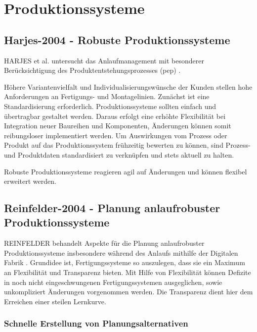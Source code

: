 \section{Produktionssysteme}

\subsection*{Harjes-2004 - Robuste Produktionssysteme}
HARJES et al. untersucht das Anlaufmanagement mit besonderer Berücksichtigung des Produktentstehungsprozesses (\gls{pep}) \autocite{Harjes2004}. 

Höhere Variantenvielfalt und Individualisierungswünsche der Kunden stellen hohe Anforderungen an Fertigungs- und Montagelinien. Zunächst ist eine Standardisierung erforderlich. Produktionssysteme sollten einfach und übertragbar gestaltet werden. Daraus erfolgt eine erhöhte Flexibilität bei Integration neuer Baureihen und Komponenten, Änderungen können somit reibungsloser implementiert werden. Um Auswirkungen vom Prozess oder Produkt auf das Produktionssystem frühzeitig bewerten zu können, sind Prozess- und Produktdaten standardisiert zu verknüpfen und stets aktuell zu halten. 

Robuste Produktionssysteme reagieren agil auf Änderungen und können flexibel erweitert werden. 

\subsection*{Reinfelder-2004 - Planung anlaufrobuster Produktionssysteme}

REINFELDER behandelt Aspekte für die Planung anlaufrobuster Produktionssysteme insbesondere während des Anlaufs mithilfe der Digitalen Fabrik %
\autocite{Reinfelder2004}. 
Grundidee ist, Fertigungssysteme so auszulegen, dass sie ein Maximum an Flexibilität und Transparenz bieten. Mit Hilfe von Flexibilität können Defizite in noch nicht eingeschwungenen Fertigungssystemen ausgeglichen, sowie unkompliziert Änderungen vorgenommen werden. Die Transparenz dient hier dem Erreichen einer steilen Lernkurve. 

\subsubsection{Schnelle Erstellung von Planungsalternativen}

